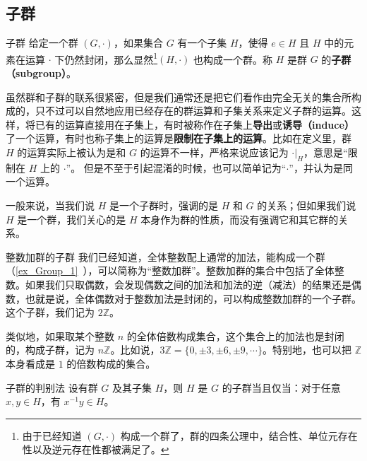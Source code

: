 

\subsection{子群}

\begin{definition}{子群}
给定一个群 $(G, \cdot)$，如果集合 $G$ 有一个子集 $H$，使得 $e\in H$ 且 $H$ 中的元素在运算 $\cdot$ 下仍然封闭，那么显然\footnote{由于已经知道 $(G,\cdot)$ 构成一个群了，群的四条公理中，结合性、单位元存在性以及逆元存在性都被满足了。}$(H,\cdot)$ 也构成一个群。称 $H$ 是群 $G$ 的\textbf{子群（subgroup）}。
\end{definition}

虽然群和子群的联系很紧密，但是我们通常还是把它们看作由完全无关的集合所构成的，只不过可以自然地应用已经存在的群运算和子集关系来定义子群的运算。这样，将已有的运算直接用在子集上，有时被称作在子集上\textbf{导出}或\textbf{诱导（induce）}了一个运算，有时也称子集上的运算是\textbf{限制在子集上的运算}。比如在定义里，群 $H$ 的运算实际上被认为是和 $G$ 的运算不一样，严格来说应该记为 $\cdot|_H$，意思是“限制在 $H$ 上的 $\cdot$”。 但是不至于引起混淆的时候，也可以简单记为“$\cdot$”，并认为是同一个运算。

一般来说，当我们说 $H$ 是一个子群时，强调的是 $H$ 和 $G$ 的关系；但如果我们说 $H$ 是一个群，我们关心的是 $H$ 本身作为群的性质，而没有强调它和其它群的关系。

\begin{example}{整数加群的子群}\label{ex_Group1_1}
我们已经知道，全体整数配上通常的加法，能构成一个群（\autoref{ex_Group_1}~），可以简称为“整数加群”。整数加群的集合中包括了全体整数。如果我们只取偶数，会发现偶数之间的加法和加法的逆（减法）的结果还是偶数，也就是说，全体偶数对于整数加法是封闭的，可以构成整数加群的一个子群。这个子群，我们记为 $2\mathbb{Z}$。

类似地，如果取某个整数 $n$ 的全体倍数构成集合，这个集合上的加法也是封闭的，构成子群，记为 $n\mathbb{Z}$。比如说，$3\mathbb{Z}=\{0, \pm3, \pm6, \pm9, \cdots\}$。特别地，也可以把 $\mathbb{Z}$ 本身看成是 $1$ 的倍数构成的集合。
\end{example}

\begin{theorem}{子群的判别法}\label{the_Group1_3}
设有群 $G$ 及其子集 $H$，则 $H$ 是 $G$ 的子群当且仅当：对于任意 $x, y\in H$，有 $x^{-1}y\in H$。
\end{theorem}

